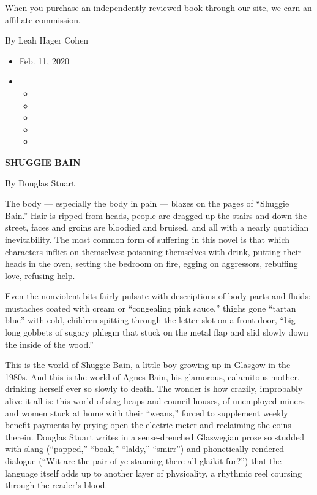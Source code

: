 When you purchase an independently reviewed book through our site, we
earn an affiliate commission.

By Leah Hager Cohen

\begin{itemize}
\item
  Feb. 11, 2020
\item
  \begin{itemize}
  \item
  \item
  \item
  \item
  \item
  \end{itemize}
\end{itemize}

\textbf{SHUGGIE BAIN}

By Douglas Stuart

The body --- especially the body in pain --- blazes on the pages of
``Shuggie Bain.'' Hair is ripped from heads, people are dragged up the
stairs and down the street, faces and groins are bloodied and bruised,
and all with a nearly quotidian inevitability. The most common form of
suffering in this novel is that which characters inflict on themselves:
poisoning themselves with drink, putting their heads in the oven,
setting the bedroom on fire, egging on aggressors, rebuffing love,
refusing help.

Even the nonviolent bits fairly pulsate with descriptions of body parts
and fluids: mustaches coated with cream or ``congealing pink sauce,''
thighs gone ``tartan blue'' with cold, children spitting through the
letter slot on a front door, ``big long gobbets of sugary phlegm that
stuck on the metal flap and slid slowly down the inside of the wood.''

This is the world of Shuggie Bain, a little boy growing up in Glasgow in
the 1980s. And this is the world of Agnes Bain, his glamorous,
calamitous mother, drinking herself ever so slowly to death. The wonder
is how crazily, improbably alive it all is: this world of slag heaps and
council houses, of unemployed miners and women stuck at home with their
``weans,'' forced to supplement weekly benefit payments by prying open
the electric meter and reclaiming the coins therein. Douglas Stuart
writes in a sense-drenched Glaswegian prose so studded with slang
(``papped,'' ``boak,'' ``laldy,'' ``smirr'') and phonetically rendered
dialogue (``Wit are the pair of ye stauning there all glaikit fur?'')
that the language itself adds up to another layer of physicality, a
rhythmic reel coursing through the reader's blood.

